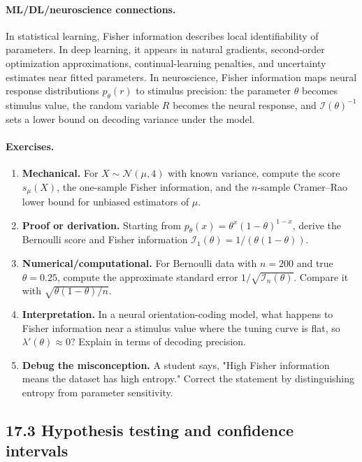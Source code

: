\paragraph{ML/DL/neuroscience connections.}
In statistical learning, Fisher information describes local identifiability of parameters. In deep learning, it appears in natural gradients, second-order optimization approximations, continual-learning penalties, and uncertainty estimates near fitted parameters. In neuroscience, Fisher information maps neural response distributions \(p_\theta(r)\) to stimulus precision: the parameter \(\theta\) becomes stimulus value, the random variable \(R\) becomes the neural response, and \(\mathcal I(\theta)^{-1}\) sets a lower bound on decoding variance under the model.

\paragraph{Exercises.}
\begin{enumerate}[label=\textbf{17.2.\arabic*.}, leftmargin=*]
\item \textbf{Mechanical.} For \(X\sim\mathcal N(\mu,4)\) with known variance, compute the score \(s_\mu(X)\), the one-sample Fisher information, and the \(n\)-sample Cramer--Rao lower bound for unbiased estimators of \(\mu\).
\item \textbf{Proof or derivation.} Starting from \(p_\theta(x)=\theta^x(1-\theta)^{1-x}\), derive the Bernoulli score and Fisher information \(\mathcal I_1(\theta)=1/(\theta(1-\theta))\).
\item \textbf{Numerical/computational.} For Bernoulli data with \(n=200\) and true \(\theta=0.25\), compute the approximate standard error \(1/\sqrt{\mathcal I_n(\theta)}\). Compare it with \(\sqrt{\theta(1-\theta)/n}\).
\item \textbf{Interpretation.} In a neural orientation-coding model, what happens to Fisher information near a stimulus value where the tuning curve is flat, so \(\lambda'(\theta)\approx0\)? Explain in terms of decoding precision.
\item \textbf{Debug the misconception.} A student says, "High Fisher information means the dataset has high entropy." Correct the statement by distinguishing entropy from parameter sensitivity.
\end{enumerate}

\subsection{17.3 Hypothesis testing and confidence intervals}

